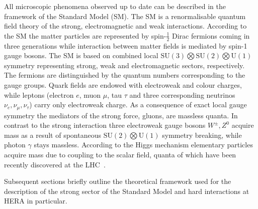 All microscopic phenomena observed up to date can be described in the framework of the Standard Model (SM). The SM is a renormalisable quantum field theory of the strong, electromagnetic and weak interactions. According to the SM the matter particles are represented by spin-$\frac{1}{2}$ Dirac fermions coming in three generations while interaction between matter fields is mediated by spin-1 gauge bosons. The SM is based on combined local $\mathrm{SU}\left(3\right) \bigotimes \mathrm{SU}\left(2\right) \bigotimes \mathrm{U}\left(1\right)$ symmetry representing strong, weak and electromagnetic sectors, respectively. The fermions are distinguished by the quantum numbers corresponding to the gauge groups. Quark fields are endowed with electroweak and colour charges, while leptons (electron $e$, muon $\mu$, tau $\tau$ and three corresponding neutrinos $\nu_e, \nu_\mu, \nu_\tau$) carry only electroweak charge. As a consequence of exact local gauge symmetry the mediators of the strong force, gluons, are massless quanta. In contrast to the strong interaction three electroweak gauge bosons $W^\pm, Z^0$ acquire mass as a result of spontaneous $\mathrm{SU}\left(2\right) \bigotimes \mathrm{U}\left(1\right)$ symmetry breaking, while photon $\gamma$ stays massless. According to the Higgs mechanism elementary particles acquire mass due to coupling to the scalar field, quanta of which have been recently discovered at the LHC~\cite{higgs atlas cms}.

Subsequent sections briefly outline the theoretical framework used for the description of the strong sector of the Standard Model and hard interactions at HERA in particular.
